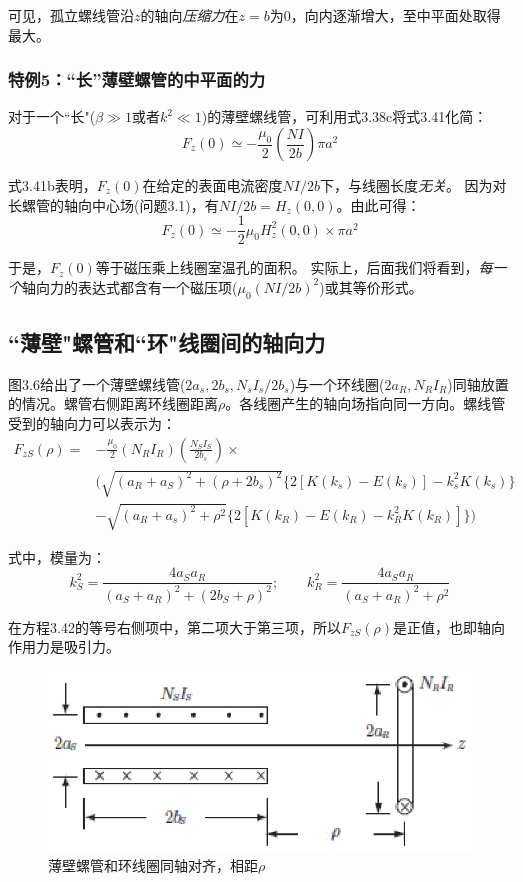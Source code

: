 可见，孤立螺线管沿$z$的轴向\textit{压缩力}在$z=b$为$0$，向内逐渐增大，至中平面处取得最大。

\subsubsection{特例5：``长''薄壁螺管的中平面的力}
对于一个``长"($\beta\gg 1$或者$k^2\ll 1$)的薄壁螺线管，可利用式3.38c将式3.41化简：
\begin{equation*}
F_z(0)\simeq-\frac{\mu_0}{2}\left(\frac{NI}{2b}\right)\pi a^2 \tag{3.41b}
\end{equation*}

式3.41b表明，$F_z(0)$在给定的表面电流密度$NI/2b$下，与线圈长度\textit{无关}。
因为对长螺管的轴向中心场(问题3.1)，有$NI/2b=H_z(0,0)$。由此可得：
\begin{equation*}
F_z(0)\simeq -\frac{1}{2}\mu_0 H_z^2(0,0)\times\pi a^2  \tag{3.41c}
\end{equation*}

于是，$F_z(0)$等于磁压乘上线圈室温孔的面积。
实际上，后面我们将看到，\textit{每一个}轴向力的表达式都含有一个磁压项($\mu_0(NI/2b)^2$)或其等价形式。

\subsection{``薄壁"螺管和``环"线圈间的轴向力}
图3.6给出了一个薄壁螺线管($2a_s,2b_s,N_s I_s/2b_s$)与一个环线圈($2a_R,N_R I_R$)同轴放置的情况。螺管右侧距离环线圈距离$\rho$。各线圈产生的轴向场指向同一方向。螺线管受到的轴向力可以表示为：
\begin{equation}
\begin{split}
F_{zS}(\rho)=&-\frac{\mu_0}{2}(N_R I_R)(\frac{N_S I_S}{2b_s})\times\\
&\big(\sqrt{(a_R+a_S)^2+(\rho+2b_s)^2}\{2[K(k_s)-E(k_s)]-k_s^2K(k_s)\}\\
&-\sqrt{(a_R+a_s)^2+\rho^2}\{2[K(k_R)-E(k_R)-k_R^2K(k_R)]\}\big)
\end{split}
\end{equation}

式中，模量为：
$$k_{S}^2=\frac{4a_S a_R}{(a_S+a_R)^2+(2b_S+\rho)^2} ;\qquad k_{R}^2=\frac{4a_S a_R}{(a_S+a_R)^2+\rho^2} $$

在方程3.42的等号右侧项中，第二项大于第三项，所以$F_{zS}(\rho)$是正值，也即轴向作用力是吸引力。
\begin{figure}[htbp]
	\centering
	\includegraphics[scale=1]{chpt3/figs/fig3.6.eps}
	\caption{薄壁螺管和环线圈同轴对齐，相距$\rho$}
\end{figure}

